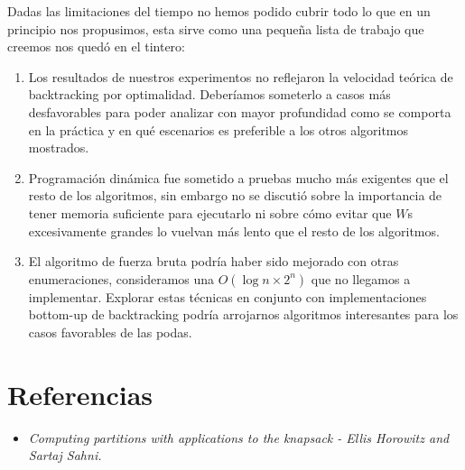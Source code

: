 \documentclass[fleqn, 11pt]{article}
\begin{document}
Dadas las limitaciones del tiempo no hemos podido cubrir todo lo que en un
principio nos propusimos, esta sirve como una pequeña lista de trabajo que
creemos nos quedó en el tintero:
\begin{enumerate}
	\item Los resultados de nuestros experimentos no reflejaron la
	velocidad teórica de backtracking por optimalidad. Deberíamos someterlo
	a casos más desfavorables para poder analizar con mayor profundidad
	como se comporta en la práctica y en qué escenarios es preferible a los
	otros algoritmos mostrados.

	\item Programación dinámica fue sometido a pruebas mucho más exigentes
	que el resto de los algoritmos, sin embargo no se discutió sobre la
	importancia de tener memoria suficiente para ejecutarlo ni sobre cómo
	evitar que $W$s excesivamente grandes lo vuelvan más lento que el resto
	de los algoritmos.

	\item El algoritmo de fuerza bruta podría haber sido mejorado con otras
	enumeraciones, consideramos una $O(\log n \times 2^n)$ que no llegamos
	a implementar.  Explorar estas técnicas en conjunto con
	implementaciones bottom-up de backtracking podría arrojarnos algoritmos
	interesantes para los casos favorables de las podas.
\end{enumerate}



\section{Referencias}
\begin{itemize}
	\item[] \textit{Computing partitions with applications to the knapsack
	- Ellis Horowitz and Sartaj Sahni.}
\end{itemize}
\end{document}
